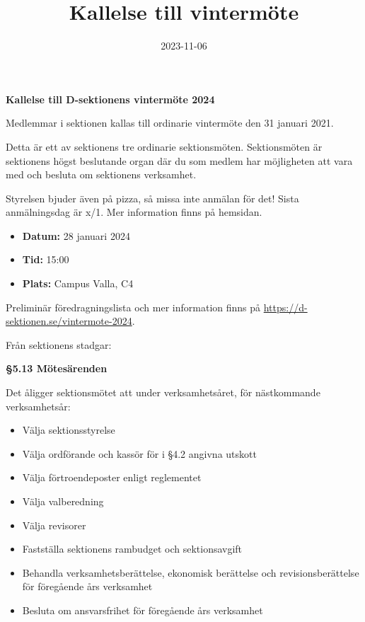 \documentclass{datateknologsektionen-document}
\title{Kallelse till vintermöte}
\date{2023-11-06}
\begin{document}





\large
\begin{center}
  \vspace*{5mm}
  {\LARGE\bfseries Kallelse till D-sektionens vintermöte 2024}
  \vspace{2mm}
\end{center}

Medlemmar i sektionen kallas till ordinarie vintermöte den 31 januari 2021. 

Detta är ett av sektionens tre ordinarie sektionsmöten. Sektionsmöten är sektionens högst beslutande organ där du som medlem har möjligheten att vara med och besluta om sektionens verksamhet. 

Styrelsen bjuder även på pizza, så missa inte anmälan för det! Sista anmälningsdag är x/1. Mer information finns på hemsidan.

\vspace*{4mm}
\begin{itemize}
  \item \textbf{Datum:} 28 januari 2024
  \item \textbf{Tid:} 15:00
  \item \textbf{Plats:} Campus Valla, C4
  \vspace*{4mm}
\end{itemize}

Preliminär föredragningslista och mer information finns på \url{https://d-sektionen.se/vintermote-2024}.


Från sektionens stadgar:

\textbf{§5.13 Mötesärenden}

Det åligger sektionsmötet att under verksamhetsåret, för nästkommande verksamhetsår:
\begin{itemize}
  \item Välja sektionsstyrelse
  \item Välja ordförande och kassör för i §4.2 angivna utskott
  \item Välja förtroendeposter enligt reglementet
  \item Välja valberedning
  \item Välja revisorer
  \item Fastställa sektionens rambudget och sektionsavgift
  \item Behandla verksamhetsberättelse, ekonomisk berättelse och revisionsberättelse för föregående års verksamhet
\item Besluta om ansvarsfrihet för föregående års verksamhet
\end{itemize}
\end{document}
